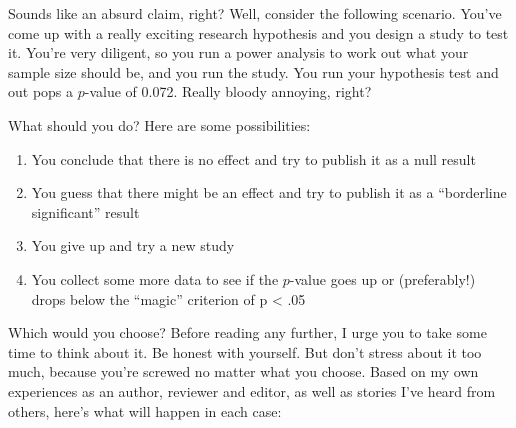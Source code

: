\documentclass[
  a4paper,
]{book}
\providecommand{\tightlist}{%
  \setlength{\itemsep}{0pt}\setlength{\parskip}{0pt}}\usepackage{longtable,booktabs,array}
\begin{document}
Sounds like an absurd claim, right? Well, consider the following
scenario. You've come up with a really exciting research hypothesis and
you design a study to test it. You're very diligent, so you run a power
analysis to work out what your sample size should be, and you run the
study. You run your hypothesis test and out pops a \(p\)-value of 0.072.
Really bloody annoying, right?

What should you do? Here are some possibilities:

\begin{enumerate}
\def\labelenumi{\arabic{enumi}.}
\tightlist
\item
  You conclude that there is no effect and try to publish it as a null
  result
\item
  You guess that there might be an effect and try to publish it as a
  ``borderline significant'' result
\item
  You give up and try a new study
\item
  You collect some more data to see if the \(p\)-value goes up or
  (preferably!) drops below the ``magic'' criterion of p \textless{} .05
\end{enumerate}

Which would you choose? Before reading any further, I urge you to take
some time to think about it. Be honest with yourself. But don't stress
about it too much, because you're screwed no matter what you choose.
Based on my own experiences as an author, reviewer and editor, as well
as stories I've heard from others, here's what will happen in each case:
\end{document}
